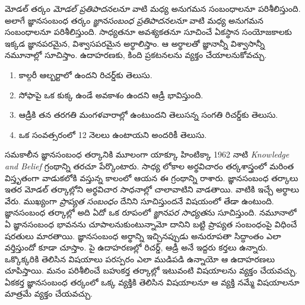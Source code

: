 \documentclass[../../../include/open-logic-section]{subfiles}
\begin{document}


మోడల్ తర్కం \emph{మోడల్ ప్రతిపాదనలనూ} వాటి మధ్య అనుగమన
సంబంధాలనూ పరిశీలిస్తుంది. అలాగే జ్ఞానసంబంధ తర్కం
\emph{జ్ఞానసంబంధ ప్రతిపాదనలనూ} వాటి మధ్య అనుగమన సంబంధాలనూ
పరిశీలిస్తుంది. సాధ్యతనూ అవశ్యకతనూ సూచించే ఏకస్థాన
సంయోజకాలకు ఇక్కడ జ్ఞానపరమైన, విశ్వాసపరమైన అర్థాలిస్తాం.
ఆ అర్థాలతో జ్ఞానాన్నీ విశ్వాసాన్నీ నమూనాల్లో సూచిస్తాం.
ఉదాహరణకు, కింది ప్రకటనలను వ్యక్తం చేయాలనుకోవచ్చు.

\begin{enumerate}
\item కాల్గరీ ఆల్బర్టాలో ఉందని రిచర్డ్‌కు తెలుసు.
\item సోఫాపై ఒక కుక్క ఉండే అవకాశం ఉందని ఆడ్రీ భావిస్తుంది.
\item ఆడ్రీకి తన తరగతి మంగళవారాల్లో ఉంటుందని తెలుసన్న సంగతి రిచర్డ్‌కు తెలుసు.
\item ఒక సంవత్సరంలో 12 నెలలు ఉంటాయని అందరికీ తెలుసు.
\end{enumerate}
సమకాలీన జ్ఞానసంబంధ తర్కానికి మూలంగా యాక్కూ హింటిక్కా
1962 నాటి \emph{Knowledge and Belief} గ్రంథాన్ని తరచూ పేర్కొంటారు. సాధ్య లోకాల అర్థవిచారం
తర్కశాస్త్రంలో మరింత విస్తృతంగా వాడుకలోకి వస్తున్న కాలంలో ఆయన ఈ గ్రంథాన్ని
రాశారు. జ్ఞానసంబంధ తర్కాలు ఇతర మోడల్ తర్కాల్లోని అర్థవిచార సాధనాల్లో
చాలావాటిని వాడతాయి. వాటికి ఇచ్చే అర్థాలు వేరు. ముఖ్యంగా
\emph{ప్రాప్యత సంబంధం} దేనిని సూచిస్తుందనే విషయంలో తేడా ఉంటుంది.
జ్ఞానసంబంధ తర్కాల్లో అది ఏదో ఒక రూపంలో \emph{జ్ఞానపర సాధ్యత}ను
సూచిస్తుంది. నమూనాలో ఏ జ్ఞానసంబంధ భావనను చూపాలనుకుంటున్నామో
దానిని బట్టి ప్రాప్యత సంబంధంపై విధించే షరతులు మారతాయి. జ్ఞానసంబంధ అర్థాన్ని ఇచ్చినప్పుడు అనురూపతా
సిద్ధాంతం ఎలా వర్తిస్తుందో కూడా చూస్తాం. పై ఉదాహరణల్లో రిచర్డ్, ఆడ్రీ అనే
ఇద్దరు కర్తలు ఉన్నారు. ఒక్కొక్కరికి తెలిసిన విషయాలు పరస్పరం ఎలా
ముడిపడి ఉన్నాయో ఆ ఉదాహరణలు చూపిస్తాయి. మనం పరిశీలించే బహుకర్త
తర్కాల్లో ఇటువంటి విషయాలను వ్యక్తం చేయవచ్చు. ఏకకర్త జ్ఞానసంబంధ తర్కంలో
ఒక్క వ్యక్తికి తెలిసిన విషయాలనూ ఆ వ్యక్తి నమ్మే విషయాలనూ మాత్రమే
వ్యక్తం చేయవచ్చు.
\end{document}
